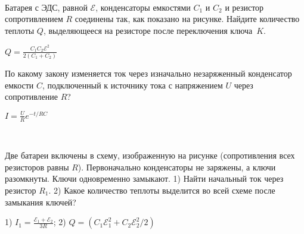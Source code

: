 \begin{ex}
\hspace{0pt} \\
\begin{minipage}{.65\textwidth}
Батарея с ЭДС, равной $\mathcal{E}$, конденсаторы емкостями $C_1$ и $C_2$ и резистор сопротивлением $R$ соединены так, как показано на рисунке. 
Найдите количество теплоты $Q$, выделяющееся на резисторе после переключения ключа~$K$.
\end{minipage}
\begin{minipage}{.35\textwidth}
\centering

\end{minipage}
\begin{ans}
$Q=\frac{C_1C_2 \mathcal{E}^2}{2(C_1+C_2)}$
\end{ans}
\end{ex}

\begin{ex} 
По какому закону изменяется ток через изначально незаряженный конденсатор емкости $C$, подключенный к источнику тока с напряжением $U$ через сопротивление $R$?
\begin{ans}
$I = \frac{U}{R} e^{-t/RC}$
\end{ans}
\end{ex}

\begin{ex} 
\hspace{0pt} \\
\begin{minipage}{.65\textwidth}
Две батареи включены в схему, изображенную на рисунке (сопротивления всех резисторов равны $R$). 
Первоначально конденсаторы не заряжены, а ключи разомкнуты. Ключи одновременно замыкают. 
1) Найти начальный ток через резистор $R_1$. 2) Какое количество теплоты выделится во всей схеме после замыкания ключей?
\end{minipage}
\begin{minipage}{.35\textwidth}
\centering

\end{minipage}
\begin{ans}
1) $I_1=\frac{\mathcal{E}_1 + \mathcal{E}_2}{3R}$; 2) $Q=(C_1 \mathcal{E}_1^2 + C_2 \mathcal{E}_2^2/2)$
\end{ans}
\end{ex}

